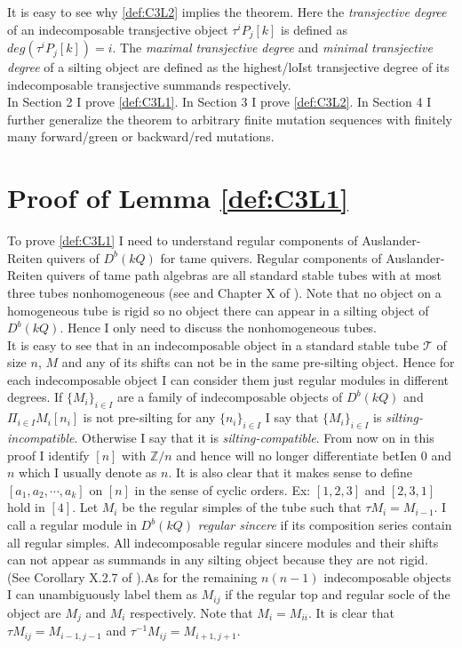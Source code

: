 \indent It is easy to see why \ref{def:C3L2} implies the theorem. Here the \textit{transjective degree} of an indecomposable transjective object $\tau^iP_j[k]$ is defined as $deg(\tau^iP_j[k])=i$. The \textit{maximal transjective degree} and \textit{minimal transjective degree} of a silting object are defined as the highest/loIst transjective degree of its indecomposable transjective summands respectively.\\
\indent In Section 2 I prove \ref{def:C3L1}. In Section 3 I prove \ref{def:C3L2}. In Section 4 I further generalize the theorem to arbitrary finite mutation sequences with finitely many forward/green or backward/red mutations.\\
\section{Proof of Lemma \ref{def:C3L1}}
\indent To prove \ref{def:C3L1} I need to understand regular components of Auslander-Reiten quivers of $D^b(kQ)$ for tame quivers. Regular components of Auslander-Reiten quivers of tame path algebras are all standard stable tubes with at most three tubes nonhomogeneous (see \cite{DR76} and Chapter X of \cite{SS06}). Note that no object on a homogeneous tube is rigid so no object there can appear in a silting object of $D^b(kQ)$. Hence I only need to discuss the nonhomogeneous tubes.\\
\indent It is easy to see that in an indecomposable object in a standard stable tube $\mathcal{T}$ of size $n$, $M$ and any of its shifts can not be in the same pre-silting object. Hence for each indecomposable object I can consider them just regular modules in different degrees. If $\{M_i\}_{i\in I}$ are a family of indecomposable objects of $D^b(kQ)$ and $\Pi_{i\in I}M_i[n_i]$ is not pre-silting for any $\{n_i\}_{i\in I}$ I say that $\{M_i\}_{i\in I}$ is \textit{silting-incompatible}. Otherwise I say that it is \textit{silting-compatible}. From now on in this proof I identify $[n]$ with $\mathbb{Z}/n$ and hence will no longer differentiate betIen $0$ and $n$ which I usually denote as $n$. It is also clear that it makes sense to define $[a_1, a_2,\cdots, a_k]$ on $[n]$ in the sense of cyclic orders. Ex: $[1,2,3]$ and $[2,3,1]$ hold in $[4]$. Let $M_i$ be the regular simples of the tube such that $\tau M_i=M_{i-1}$. I call a regular module in $D^b(kQ)$ \textit{regular sincere} if its composition series contain all regular simples. All indecomposable regular sincere modules and their shifts can not appear as summands in any silting object because they are not rigid. (See Corollary X.2.7 of \cite{SS06}).As for the remaining $n(n-1)$ indecomposable objects I can unambiguously label them as $M_{ij}$ if the regular top and regular socle of the object are $M_j$ and $M_i$ respectively. Note that $M_i=M_{ii}$. It is clear that $\tau M_{ij}=M_{i-1,j-1}$ and $\tau^{-1} M_{ij}=M_{i+1,j+1}$.\\
